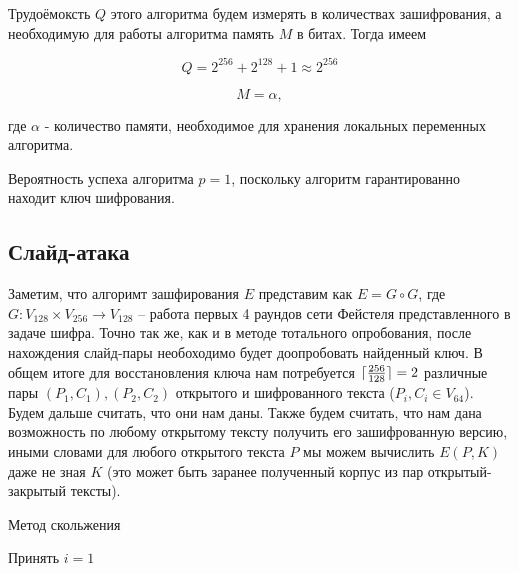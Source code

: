 \documentclass[a4paper,12pt]{article}
\DeclarePairedDelimiter{\ceil}{\lceil}{\rceil}
\theoremstyle{definition}
\begin{document}
	Трудоёмоксть $Q$ этого алгоритма будем измерять в количествах зашифрования, а необходимую для работы алгоритма память $M$ в битах. Тогда имеем
	
	\[ Q = 2^{256} + 2^{128} + 1 \approx 2^{256} \]
	
	\[ M = \alpha, \]
	
	где $\alpha$ - количество памяти, необходимое для хранения локальных переменных алгоритма.
	
	Вероятность успеха алгоритма $p = 1$, поскольку алгоритм гарантированно находит ключ шифрования.

	\subsection*{Слайд-атака}
	
	Заметим, что алгоримт зашфирования $E$ представим как $E=G \circ G$, где $G: V_{128} \times V_{256} \rightarrow V_{128}$ -- работа первых 4 раундов сети Фейстеля представленного в задаче шифра. Точно так же, как и в методе тотального опробования, после нахождения слайд-пары необоходимо будет доопробовать найденный ключ. В общем итоге для восстановления ключа нам потребуется $\ceil{\frac{256}{128}} = 2$ различные пары $(P_1, C_1), (P_2, C_2)$ открытого и шифрованного текста ($P_i, C_i \in V_{64}$). Будем дальше считать, что они нам даны. Также будем считать, что нам дана возможность по любому открытому тексту получить его зашифрованную версию, иными словами для любого открытого текста $P$ мы можем вычислить $E(P, K)$ даже не зная $K$ (это может быть заранее полученный корпус из пар открытый-закрытый тексты).
	
	\begin{algorithm}[H]
		
		\caption{Метод скольжения}
		\label{alg:Slide}
		\SetAlgoNoEnd 
		
		
		Принять $i=1$
		
	\end{algorithm}	
\end{document}
